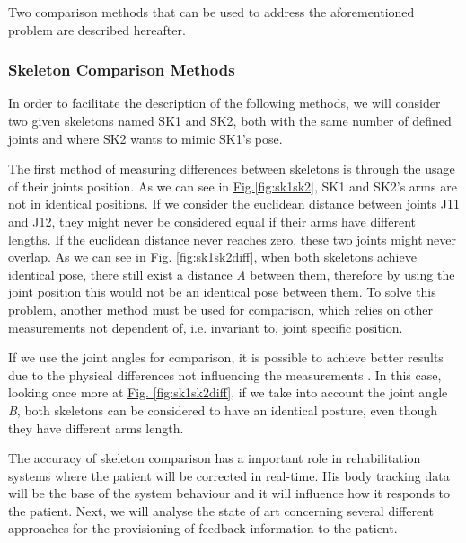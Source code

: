 \documentclass[runningheads]{llncs}
\begin{document}
Two comparison methods that can be used to address the aforementioned problem are described hereafter.

\subsubsection{Skeleton Comparison Methods}

In order to facilitate the description of the following methods, we will consider two given skeletons named SK1 and SK2, both with the same number of defined joints and where SK2 wants to mimic SK1's pose.

The first method of measuring differences between skeletons is through the usage of their joints position. 
As we can see in \hyperref[fig:sk1sk2]{Fig.\ref{fig:sk1sk2}}, SK1 and SK2's arms are not in identical positions. 
If we consider the euclidean distance between joints J11 and J12, they might never be considered equal if their arms have different lengths. 
If the euclidean distance never reaches zero, these two joints might never overlap. As we can see in \hyperref[fig:sk1sk2diff]{Fig. \ref{fig:sk1sk2diff}}, 
when both skeletons achieve identical pose, there still exist a distance \textit{A} between them, therefore by using the joint position 
this would not be an identical pose between them.
To solve this problem, another method must be used for comparison, 
which relies on other measurements not dependent of, i.e. invariant to, joint specific position. 

If we use the joint angles for comparison, it is possible to achieve better results due to 
the physical differences not influencing the measurements \cite{Borghese2013}. 
In this case, looking once more at \hyperref[fig:sk1sk2diff]{Fig. \ref{fig:sk1sk2diff}}, 
if we take into account the joint angle \textit{B}, both skeletons can be considered to have an identical posture, even though they have different arms length.

The accuracy of skeleton comparison has a important role in rehabilitation systems 
where the patient will be corrected in real-time. His body tracking data will be the 
base of the system behaviour and it will influence how it responds to the patient. 
Next, we will analyse the state of art concerning several different approaches for 
the provisioning of feedback information to the patient.
\end{document}
